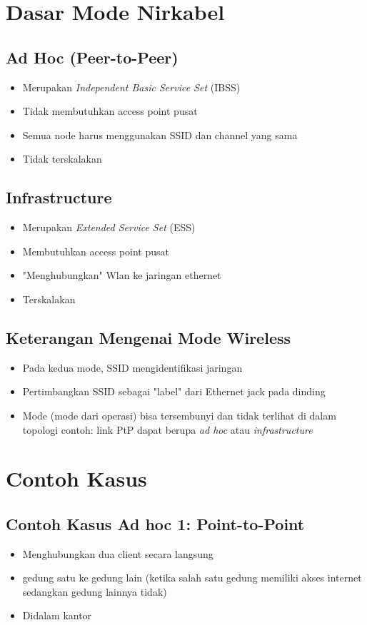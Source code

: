 \documentclass[a4paper,12pt]{article}
\begin{document}
\section{Dasar Mode Nirkabel}
\subsection{Ad Hoc (Peer-to-Peer)}
\begin{itemize}
    \item Merupakan \textit{Independent Basic Service Set} (IBSS)
    \item Tidak membutuhkan access point pusat
    \item Semua node harus menggunakan SSID dan channel yang sama
    \item Tidak terskalakan
\end{itemize}

\subsection{Infrastructure}
\begin{itemize}
    \item Merupakan \textit{Extended Service Set} (ESS)
    \item Membutuhkan access point pusat
    \item "Menghubungkan" Wlan ke jaringan ethernet
    \item Terskalakan
\end{itemize}

\subsection{Keterangan Mengenai Mode Wireless}
\begin{itemize}
    \item Pada kedua mode, SSID mengidentifikasi jaringan
    \item Pertimbangkan SSID sebagai "label" dari Ethernet jack pada dinding
    \item Mode (mode dari operasi) bisa tersembunyi dan tidak terlihat di dalam topologi
        \subitem contoh: link PtP dapat berupa \textit{ad hoc} atau \textit{infrastructure}
\end{itemize}

\section{Contoh Kasus}
\subsection{Contoh Kasus Ad hoc 1: Point-to-Point}
\begin{itemize}
    \item Menghubungkan dua client secara langsung
    \item gedung satu ke gedung lain (ketika salah satu gedung memiliki akses internet sedangkan gedung lainnya tidak)
    \item Didalam kantor
\end{itemize}
\end{document}

